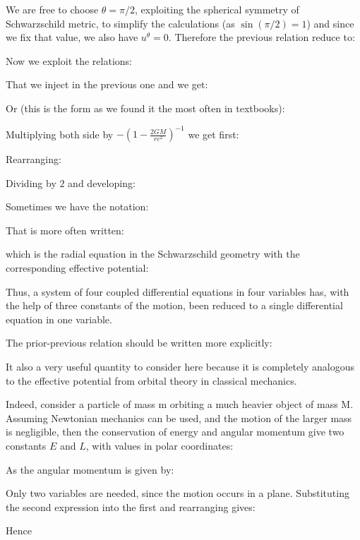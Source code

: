 	We are free to choose $\theta=\pi/2$, exploiting the spherical symmetry of Schwarzschild metric, to simplify the calculations (as $\sin(\pi/2)=1$) and since we fix that value, we also have $u^\theta=0$. Therefore the previous relation reduce to:
	
	Now we exploit the relations:
	
	That we inject in the previous one and we get:
	
	Or (this is the form as we found it the most often in textbooks):
	
	Multiplying both side by $-\left(1-\frac{2GM}{rc^2}\right)^{-1}$ we get first:
	
	Rearranging:
	
	Dividing by $2$ and developing:
	
	\begin{tcolorbox}[title=Remark,colframe=black,arc=10pt]
	Sometimes we have the notation:
	
	\end{tcolorbox}
	That is more often written:
	
	which is the radial equation in the Schwarzschild geometry with the corresponding effective potential:
	
	Thus, a system of four coupled differential equations in four variables has, with the help of three constants of the motion, been reduced to a single differential equation in one variable.
	\begin{tcolorbox}[title=Remark,colframe=black,arc=10pt]
	The prior-previous relation should be written more explicitly:
	
	\end{tcolorbox}
	It also a very useful quantity to consider here because it is completely analogous to the effective potential from orbital theory in
classical mechanics.

	Indeed, consider a particle of mass m orbiting a much heavier object of mass M. Assuming Newtonian mechanics can be used, and the motion of the larger mass is negligible, then the conservation of energy and angular momentum give two constants $E$ and $L$, with values in polar coordinates:
	
	As the angular momentum is given by:
	
	Only two variables are needed, since the motion occurs in a plane. Substituting the second expression into the first and rearranging gives:
	
	Hence
	
